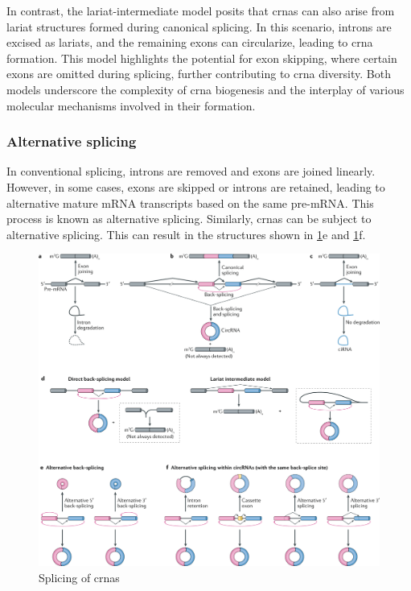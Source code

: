 In contrast, the lariat-intermediate model posits that \gls{crna}s can also
arise from lariat structures formed during canonical splicing.
In this scenario, introns are excised as lariats, and the remaining exons can
circularize, leading to \gls{crna}
formation\supercite{humphreys_ularcirc_2019,barrett_circular_2015}.
This model highlights the potential for exon skipping, where certain exons are
omitted during splicing, further contributing to \gls{crna}
diversity\supercite{sun_microarray_2020,barrett_circular_2015}.
Both models underscore the complexity of \gls{crna} biogenesis and the
interplay of various molecular mechanisms involved in their
formation\supercite{sharma_recent_2021}.


\subsubsection{Alternative splicing}
\label{sec:circrna_alternative_splicing}
In conventional splicing, introns are removed and exons are joined linearly.
However, in some cases, exons are skipped or introns are retained, leading to
alternative mature mRNA transcripts based on the same pre-mRNA.
This process is known as alternative splicing\supercite{nilsen_expansion_2010}.
Similarly, \gls{crna}s can be subject to alternative splicing.
This can result in the structures shown in \cref{fig:circrna_splicing}e and
\cref{fig:circrna_splicing}f.

\begin{figure}[ht]
    \centering

    \includegraphics[width=\textwidth]{chapters/2_background/figures/circRNA-splicing.png}
    \caption{Splicing of \gls{crna}s} %
    \label{fig:circrna_splicing}
\end{figure}

